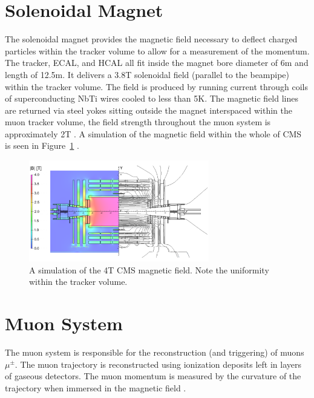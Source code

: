 \section{Solenoidal Magnet}

The solenoidal magnet provides the magnetic field necessary to deflect charged particles within the tracker volume to allow for a measurement of the momentum. The tracker, ECAL, and HCAL all fit inside the magnet bore diameter of 6m and length of 12.5m. It delivers a 3.8T solenoidal field (parallel to the beampipe) within the tracker volume. The field is produced by running current through coils of superconducting NbTi wires cooled to less than 5K. The magnetic field lines are returned via steel yokes sitting outside the magnet interspaced within the muon tracker volume, the field strength throughout the muon system is approximately 2T \cite{magnettdr}. A simulation of the magnetic field within the whole of CMS is seen in Figure~\ref{fig:magnet} \cite{magnet}.

\begin{figure}
\centering
\includegraphics[width=0.7\textwidth]{figs/magnet.png}
\caption[A simulation of the 4T CMS magnetic field.]
{A simulation of the 4T CMS magnetic field. Note the uniformity within the tracker volume.}
\label{fig:magnet}
\end{figure}

\section{Muon System}

The muon system is responsible for the reconstruction (and triggering) of muons $\mu^{\pm}$. The muon trajectory is reconstructed using ionization deposits left in layers of gaseous detectors. The muon momentum is measured by the curvature of the trajectory when immersed in the magnetic field \cite{muontdr}.

